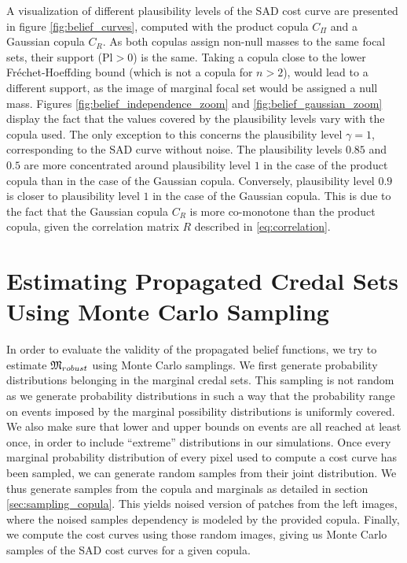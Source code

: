 A visualization of different plausibility levels of the SAD cost curve are presented in figure \ref{fig:belief_curves}, computed with the product copula $C_\Pi$ and a Gaussian copula $C_R$. As both copulas assign non-null masses to the same focal sets, their support ($\mathrm{Pl}>0$) is the same. Taking a copula close to the lower Fréchet-Hoeffding bound (which is not a copula for $n>2$), would lead to a different support, as the image of marginal focal set would be assigned a null mass. Figures \ref{fig:belief_independence_zoom} and \ref{fig:belief_gaussian_zoom} display the fact that the values covered by the plausibility levels vary with the  copula used. The only exception to this concerns the plausibility level $\gamma=1$, corresponding to the SAD curve without noise. The plausibility levels $0.85$ and $0.5$ are more concentrated around plausibility level $1$ in the case of the product copula than in the case of the Gaussian copula. Conversely, plausibility level $0.9$ is closer to plausibility level $1$ in the case of the Gaussian copula. This is due to the fact that the Gaussian copula $C_R$ is more co-monotone than the product copula, given the correlation matrix $R$ described in \eqref{eq:correlation}.

\section{Estimating Propagated Credal Sets Using Monte Carlo Sampling}
In order to evaluate the validity of the propagated belief functions, we try to estimate ${\mathfrak{M}}_{robust}$ using Monte Carlo samplings. We first generate probability distributions belonging in the marginal credal sets. This sampling is not random as we generate probability distributions in such a way that the probability range on events imposed by the marginal possibility distributions is uniformly covered. We also make sure that lower and upper bounds on events are all reached at least once, in order to include ``extreme'' distributions in our simulations. Once every marginal probability distribution of every pixel used to compute a cost curve has been sampled, we can generate random samples from their joint distribution. We thus generate samples from the copula and marginals as detailed in section \ref{sec:sampling_copula}. This yields noised version of patches from the left images, where the noised samples dependency is modeled by the provided copula. Finally, we compute the cost curves using those random images, giving us Monte Carlo samples of the SAD cost curves for a given copula.

